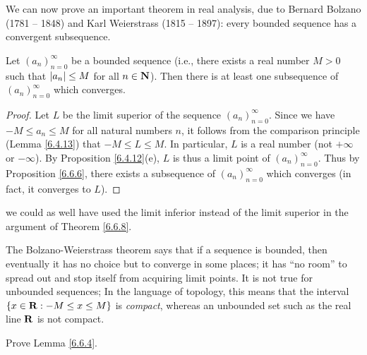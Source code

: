 \begin{note}
    We can now prove an important theorem in real analysis, due to Bernard Bolzano (1781 -- 1848) and Karl Weierstrass (1815 -- 1897):
    every bounded sequence has a convergent subsequence.
\end{note}

\begin{theorem}\label{6.6.8}
    Let \((a_n)_{n = 0}^\infty\) be a bounded sequence
    (i.e., there exists a real number \(M > 0\) such that \(\left\lvert a_n\right\rvert \leq M\) for all \(n \in \mathbf{N}\)).
    Then there is at least one subsequence of \((a_n)_{n = 0}^\infty\) which converges.
\end{theorem}

\begin{proof}
    Let \(L\) be the limit superior of the sequence \((a_n)_{n = 0}^\infty\).
    Since we have \(-M \leq a_n \leq M\) for all natural numbers \(n\), it follows from the comparison principle (Lemma \ref{6.4.13}) that \(-M \leq L \leq M\).
    In particular, \(L\) is a real number (not \(+\infty\) or \(-\infty\)).
    By Proposition \ref{6.4.12}(e), \(L\) is thus a limit point of \((a_n)_{n = 0}^\infty\).
    Thus by Proposition \ref{6.6.6}, there exists a subsequence of \((a_n)_{n = 0}^\infty\) which converges
    (in fact, it converges to \(L\)).
\end{proof}

\begin{note}
    we could as well have used the limit inferior instead of the limit superior in the argument of Theorem \ref{6.6.8}.
\end{note}

\begin{remark}\label{6.6.9}
    The Bolzano-Weierstrass theorem says that if a sequence is bounded, then eventually it has no choice but to converge in some places;
    it has ``no room'' to spread out and stop itself from acquiring limit points.
    It is not true for unbounded sequences;
    In the language of topology, this means that the interval \(\{x \in \mathbf{R} : -M \leq x \leq M\}\) is \emph{compact}, whereas an unbounded set such as the real line \(\mathbf{R}\) is not compact.
\end{remark}

\exercisesection

\begin{exercise}\label{ex 6.6.1}
    Prove Lemma \ref{6.6.4}.
\end{exercise}

